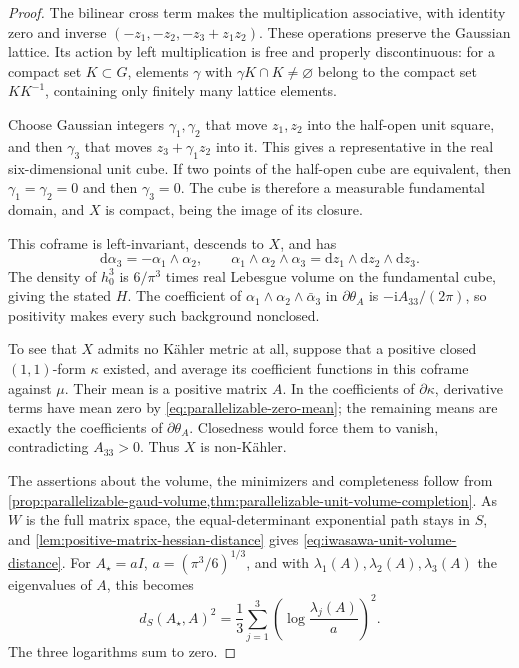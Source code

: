 \begin{proof}
The bilinear cross term makes the multiplication associative, with identity zero and inverse $(-z_1,-z_2,-z_3+z_1z_2)$. These operations preserve the Gaussian lattice. Its action by left multiplication is free and properly discontinuous: for a compact set $K\subset G$, elements $\gamma$ with $\gamma K\cap K\ne\varnothing$ belong to the compact set $KK^{-1}$, containing only finitely many lattice elements.

Choose Gaussian integers $\gamma_1,\gamma_2$ that move $z_1,z_2$ into the half-open unit square, and then $\gamma_3$ that moves $z_3+\gamma_1z_2$ into it. This gives a representative in the real six-dimensional unit cube. If two points of the half-open cube are equivalent, then $\gamma_1=\gamma_2=0$ and then $\gamma_3=0$. The cube is therefore a measurable fundamental domain, and $X$ is compact, being the image of its closure.

This coframe is left-invariant, descends to $X$, and has
\[
 \mathrm d\alpha_3=-\alpha_1\wedge\alpha_2,\qquad
 \alpha_1\wedge\alpha_2\wedge\alpha_3
       =\mathrm dz_1\wedge\mathrm dz_2\wedge\mathrm dz_3.
\]
The density of $h_0^3$ is $6/\pi^3$ times real Lebesgue volume on the fundamental cube, giving the stated $H$. The coefficient of $\alpha_1\wedge\alpha_2\wedge\bar\alpha_3$ in $\partial\theta_A$ is $-\mathrm iA_{33}/(2\pi)$, so positivity makes every such background nonclosed.

To see that $X$ admits no K\"ahler metric at all, suppose that a positive closed $(1,1)$-form $\kappa$ existed, and average its coefficient functions in this coframe against $\mu$. Their mean is a positive matrix $A$. In the coefficients of $\partial\kappa$, derivative terms have mean zero by \eqref{eq:parallelizable-zero-mean}; the remaining means are exactly the coefficients of $\partial\theta_A$. Closedness would force them to vanish, contradicting $A_{33}>0$. Thus $X$ is non-K\"ahler.

The assertions about the volume, the minimizers and completeness follow from \cref{prop:parallelizable-gaud-volume,thm:parallelizable-unit-volume-completion}. As $W$ is the full matrix space, the equal-determinant exponential path stays in $S$, and \cref{lem:positive-matrix-hessian-distance} gives \eqref{eq:iwasawa-unit-volume-distance}. For $A_\star=aI$, $a=(\pi^3/6)^{1/3}$, and with $\lambda_1(A),\lambda_2(A),\lambda_3(A)$ the eigenvalues of $A$, this becomes
\[
 d_S(A_\star,A)^2=\frac13\sum_{j=1}^3
       \left(\log\frac{\lambda_j(A)}a\right)^2.
\]
The three logarithms sum to zero.


\end{proof}
